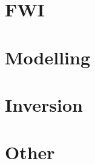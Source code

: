\documentclass[aspectratio=169, 11pt, t]{beamer}
\newcommand{\secinctex}[1]{}
\begin{document}


\section{FWI}

\secinctex{Tromp_2005_GJI_Adjoint-method}
\secinctex{Louboutin_2017_EAGE_Gradient-sampling-algorithm}
\secinctex{Komatitsch_2016_GJI_Anelastic-kernels-with-parsimonious-storage}

\section{Modelling}

\section{Inversion}
\secinctex{Sambridge_2001_IP_Neighborhood-algorithm}
\secinctex{Sambridge_2002_RG_Monte-Carlo-inversion}
\secinctex{Minson_2013_GJI_Bayesian-inversion-for-source}

\section{Other}


\end{document}
